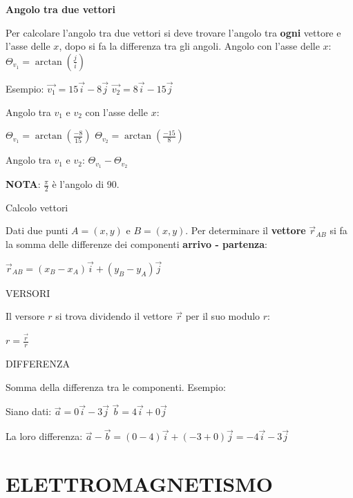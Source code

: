 \documentclass{article}
\begin{document}
\textbf{Angolo tra due vettori}

Per calcolare l'angolo tra due vettori si deve trovare l'angolo tra \textbf{ogni} vettore e l'asse delle $x$, dopo si fa la differenza tra gli angoli.
Angolo con l'asse delle $x$: $\Theta_{v_1}=\arctan(\frac{j}{i})$

Esempio:
$\overrightarrow{v_1} = 15\overrightarrow{i} - 8\overrightarrow{j}$
$\overrightarrow{v_2} = 8\overrightarrow{i} - 15\overrightarrow{j}$


Angolo tra $v_1$ e $v_2$ con l'asse delle $x$:

$\Theta_{v_1}=\arctan(\frac{-8}{15})$
$\Theta_{v_2}=\arctan(\frac{-15}{8})$

Angolo tra $v_1$ e $v_2$: $\Theta_{v_1}-\Theta_{v_2}$

\textbf{NOTA}: $\frac{\pi}{2}$ è l'angolo di 90.

Calcolo vettori

Dati due punti $A=(x,y)$ e $B=(x,y)$. Per determinare il \textbf{vettore} $\overrightarrow{r}_{AB}$ si fa la somma delle differenze dei componenti \textbf{arrivo - partenza}:

$\overrightarrow{r}_{AB} = (x_B-x_A)\overrightarrow{i} + (y_B-y_A)\overrightarrow{j}$


VERSORI

Il versore $r$ si trova dividendo il vettore $\overrightarrow{r}$ per il suo modulo $r$:

$r=\frac{\overrightarrow{r}}{r}$


DIFFERENZA

Somma della differenza tra le componenti. Esempio:

Siano dati:
$\overrightarrow{a} = 0\overrightarrow{i}-3\overrightarrow{j}$
$\overrightarrow{b} = 4\overrightarrow{i}+0\overrightarrow{j}$

La loro differenza:
$\overrightarrow{a}-\overrightarrow{b} = (0-4)\overrightarrow{i}+(-3+0)\overrightarrow{j} = -4\overrightarrow{i}-3\overrightarrow{j}$


\pagebreak

\section{ELETTROMAGNETISMO}
\end{document}
